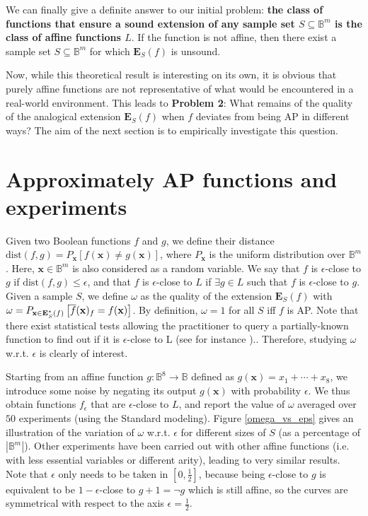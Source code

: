 We can finally give a definite answer to our initial problem: {\bf the class of
functions that ensure a sound extension of any sample set $S \subseteq
\mathbb{B}^m$ is the class of affine functions $L$}. If the function is not
affine, then there exist a sample set $S \subseteq \mathbb{B}^m$ for which
$\mathbf{E}_S(f)$ is unsound.

Now, while this theoretical result is interesting on its own, it is obvious
that purely affine functions are not representative of what would be
encountered in a real-world environment.  This leads to {\bf Problem 2}: What
remains of the quality of the analogical extension $\mathbf{E}_S(f)$ when $f$
deviates from being AP in different ways?  The aim of the next section is to
empirically investigate this question.

\section{Approximately AP functions and experiments}
\label{approximate_ap_functions}

Given two Boolean functions $f$ and $g$, we define their distance
$\text{dist}(f, g) = P_\mathbf{x}\left[f(\mathbf{x}) \neq
g(\mathbf{x})\right]$, where $P_\mathbf{x}$ is the uniform distribution over
$\mathbb{B}^m$. Here, $\mathbf{x} \in \mathbb{B}^m$ is also considered as a
random variable. We say that $f$ is $\epsilon$-close to $g$ if $\text{dist}(f,
g) \leq \epsilon$, and that $f$ is $\epsilon$-close to $L$ if $\exists g \in L$
such that $f$ is $\epsilon$-close to $g$. Given a sample $S$, we define
$\omega$ as the quality of the extension $\mathbf{E}_S(f)$ with $\omega =
P_{\mathbf{x}\in \mathbf{E}^*_S(f)}\left[\overline{f}(\mathbf{x})_f =
f(\mathbf{x})\right]$. By definition, $\omega=1$ for all $S$ iff $f$ is AP.
Note that there exist statistical tests allowing the practitioner to query a
partially-known function to find out if it is $\epsilon$-close to L (see for
instance \cite{BluLubRub93}).. Therefore, studying $\omega$ w.r.t. $\epsilon$
is clearly of interest.

Starting from an affine function $g \colon \mathbb{B}^8 \to \mathbb{B}$ defined
as  $g(\mathbf{x}) = x_1 + \cdots + x_8$, we introduce some noise by negating
its output $g(\mathbf{x})$ with probability $\epsilon$. We thus obtain
functions $f_{\epsilon}$ that are $\epsilon$-close to $L$, and report the value
of $\omega$ averaged over $50$ experiments (using the Standard modeling).
Figure \ref{omega_vs_eps} gives an illustration of the variation of $\omega$
w.r.t.  $\epsilon$ for different sizes of $S$ (as a percentage of
$|\mathbb{B}^m|$).  Other experiments have been carried out with other affine
functions (i.e.  with less essential variables or different arity), leading to
very similar results.  Note that $\epsilon$ only needs to be taken in $[0,
\frac{1}{2}]$, because being $\epsilon$-close to $g$ is equivalent to be $1 -
\epsilon$-close to $g + 1 = \neg g$ which is still affine, so the curves are
symmetrical with respect to the axis $\epsilon = \frac{1}{2}$.

